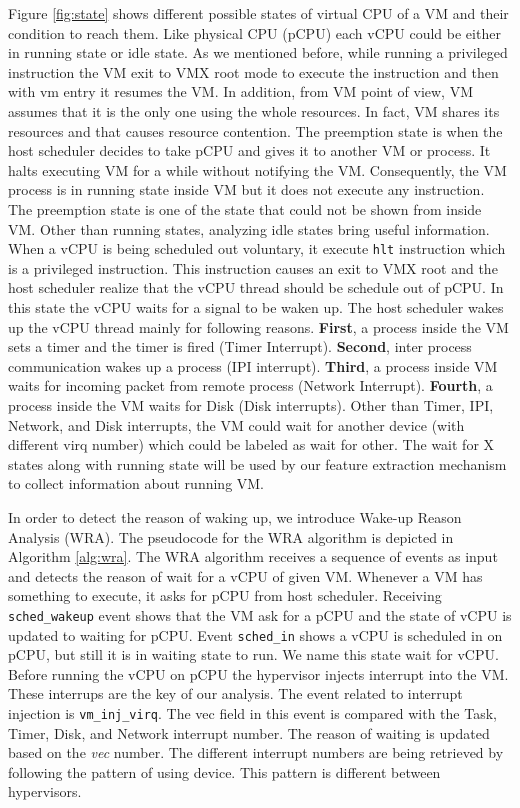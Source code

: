 \documentclass[10pt, conference, compsocconf]{IEEEtran}
\begin{document}
Figure \ref{fig:state} shows different possible states of virtual CPU of a VM and their condition to reach them. Like physical CPU (pCPU) each vCPU could be either in running state or idle state. As we mentioned before, while running a privileged instruction the VM exit to VMX root mode to execute the instruction and then with vm entry it resumes the VM. In addition, from VM point of view, VM assumes that it is the only one using the whole resources. In fact, VM shares its resources and that causes resource contention. The preemption state is when the host scheduler decides to take pCPU and gives it to another VM or process. It halts executing VM for a while without notifying the VM. Consequently, the VM process is in running state inside VM but it does not execute any instruction. The preemption state is one of the state that could not be shown from inside VM. Other than running states, analyzing idle states bring useful information. When a vCPU is being scheduled out voluntary, it execute \texttt{hlt} instruction which is a privileged instruction. This instruction causes an exit to VMX root and the host scheduler realize that the vCPU thread should be schedule out of pCPU. In this state the vCPU
waits for a signal to be waken up. The host scheduler wakes up the vCPU thread mainly for following reasons. \textbf{First}, a process inside the VM sets a timer and the timer is fired (Timer Interrupt). \textbf{Second}, inter process communication wakes up a process (IPI interrupt). \textbf{Third}, a process inside VM waits for incoming packet from remote process (Network Interrupt). \textbf{Fourth}, a process inside the VM waits for Disk (Disk interrupts). Other than Timer, IPI, Network, and Disk interrupts, the VM could wait for another device (with different virq number) which could be labeled as wait for other. The wait for X states along with running state will be used by our feature extraction mechanism to collect information about running VM. 

In order to detect the reason of waking up, we introduce Wake-up Reason Analysis (WRA). The pseudocode for the WRA algorithm is depicted in Algorithm \ref{alg:wra}. The WRA algorithm receives a sequence of events as input and detects the reason of wait for a vCPU of given VM. Whenever a VM has something to execute, it asks for pCPU from host scheduler. Receiving \texttt{sched\_wakeup} event shows that the VM ask for a pCPU and the state of vCPU is updated to waiting for pCPU. Event \texttt{sched\_in} shows a vCPU is scheduled in on pCPU, but still it is in waiting state to run. We name this state wait for vCPU. Before running the vCPU on pCPU the hypervisor injects interrupt into the VM. These interrups are the key of our analysis. The event related to interrupt injection is \texttt{vm\_inj\_virq}. The vec field in this event is compared with the Task, Timer, Disk, and Network interrupt number. The reason of waiting is updated based on the \textit{vec} number. The different interrupt numbers are being retrieved by following the pattern of using device. This pattern is different between hypervisors.  
\end{document}
